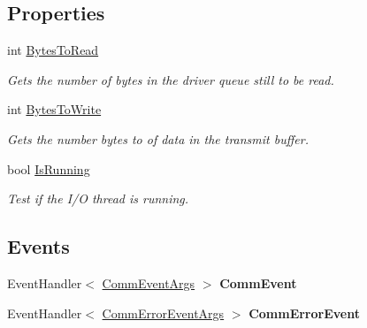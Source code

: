 \subsection*{Properties}
\begin{DoxyCompactItemize}
\item 
int \mbox{\hyperlink{class_r_j_c_p_1_1_i_o_1_1_ports_1_1_native_1_1_windows_1_1_comm_overlapped_io_a81c3607f88b61c951fcabe4aeb4bc90c}{Bytes\+To\+Read}}
\begin{DoxyCompactList}\small\item\em Gets the number of bytes in the driver queue still to be read. \end{DoxyCompactList}\item 
int \mbox{\hyperlink{class_r_j_c_p_1_1_i_o_1_1_ports_1_1_native_1_1_windows_1_1_comm_overlapped_io_a9353014aa124290bee2df248c033789a}{Bytes\+To\+Write}}
\begin{DoxyCompactList}\small\item\em Gets the number bytes to of data in the transmit buffer. \end{DoxyCompactList}\item 
bool \mbox{\hyperlink{class_r_j_c_p_1_1_i_o_1_1_ports_1_1_native_1_1_windows_1_1_comm_overlapped_io_aa6fd1bdb14e71409f4f3662c6b2477a4}{Is\+Running}}
\begin{DoxyCompactList}\small\item\em Test if the I/O thread is running. \end{DoxyCompactList}\end{DoxyCompactItemize}
\subsection*{Events}
\begin{DoxyCompactItemize}
\item 
\mbox{\label{class_r_j_c_p_1_1_i_o_1_1_ports_1_1_native_1_1_windows_1_1_comm_overlapped_io_a31aa9c2467b0eca7d35b208625a78fdb}} 
Event\+Handler$<$ \mbox{\hyperlink{class_r_j_c_p_1_1_i_o_1_1_ports_1_1_native_1_1_windows_1_1_comm_event_args}{Comm\+Event\+Args}} $>$ {\bfseries Comm\+Event}
\item 
\mbox{\label{class_r_j_c_p_1_1_i_o_1_1_ports_1_1_native_1_1_windows_1_1_comm_overlapped_io_af6b6673a8264b6808687a9cc448a39fd}} 
Event\+Handler$<$ \mbox{\hyperlink{class_r_j_c_p_1_1_i_o_1_1_ports_1_1_native_1_1_windows_1_1_comm_error_event_args}{Comm\+Error\+Event\+Args}} $>$ {\bfseries Comm\+Error\+Event}
\end{DoxyCompactItemize}


